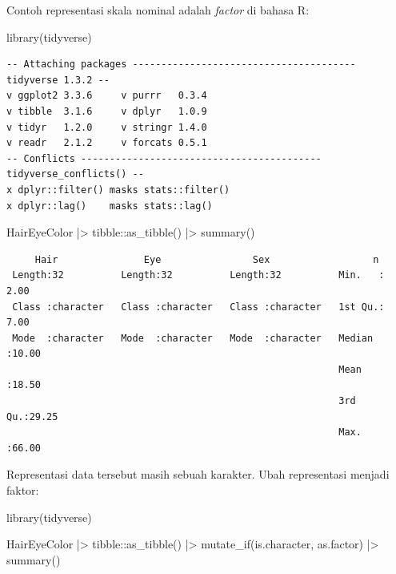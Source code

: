 \documentclass[
  letterpaper,
  DIV=11,
  numbers=noendperiod]{scrreprt}
\newenvironment{Shaded}{\begin{snugshade}}{\end{snugshade}}
\newcommand{\FunctionTok}[1]{\textcolor[rgb]{0.28,0.35,0.67}{#1}}
\newcommand{\NormalTok}[1]{\textcolor[rgb]{0.00,0.23,0.31}{#1}}
\newcommand{\SpecialCharTok}[1]{\textcolor[rgb]{0.37,0.37,0.37}{#1}}
\begin{document}
Contoh representasi skala nominal adalah \emph{factor} di bahasa R:

\begin{Shaded}
\begin{Highlighting}[numbers=left,,]
\FunctionTok{library}\NormalTok{(tidyverse)}
\end{Highlighting}
\end{Shaded}

\begin{verbatim}
-- Attaching packages --------------------------------------- tidyverse 1.3.2 --
v ggplot2 3.3.6     v purrr   0.3.4
v tibble  3.1.6     v dplyr   1.0.9
v tidyr   1.2.0     v stringr 1.4.0
v readr   2.1.2     v forcats 0.5.1
-- Conflicts ------------------------------------------ tidyverse_conflicts() --
x dplyr::filter() masks stats::filter()
x dplyr::lag()    masks stats::lag()
\end{verbatim}

\begin{Shaded}
\begin{Highlighting}[numbers=left,,]
\NormalTok{HairEyeColor }\SpecialCharTok{|\textgreater{}} 
\NormalTok{  tibble}\SpecialCharTok{::}\FunctionTok{as\_tibble}\NormalTok{() }\SpecialCharTok{|\textgreater{}} \FunctionTok{summary}\NormalTok{()}
\end{Highlighting}
\end{Shaded}

\begin{verbatim}
     Hair               Eye                Sex                  n        
 Length:32          Length:32          Length:32          Min.   : 2.00  
 Class :character   Class :character   Class :character   1st Qu.: 7.00  
 Mode  :character   Mode  :character   Mode  :character   Median :10.00  
                                                          Mean   :18.50  
                                                          3rd Qu.:29.25  
                                                          Max.   :66.00  
\end{verbatim}

Representasi data tersebut masih sebuah karakter. Ubah representasi
menjadi faktor:

\begin{Shaded}
\begin{Highlighting}[numbers=left,,]
\FunctionTok{library}\NormalTok{(tidyverse)}

\NormalTok{HairEyeColor }\SpecialCharTok{|\textgreater{}} 
\NormalTok{  tibble}\SpecialCharTok{::}\FunctionTok{as\_tibble}\NormalTok{() }\SpecialCharTok{|\textgreater{}}
  \FunctionTok{mutate\_if}\NormalTok{(is.character, as.factor) }\SpecialCharTok{|\textgreater{}}
  \FunctionTok{summary}\NormalTok{()}
\end{Highlighting}
\end{Shaded}
\end{document}
